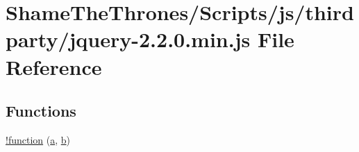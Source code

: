 \hypertarget{jquery-2_82_80_8min_8js}{}\section{Shame\+The\+Thrones/\+Scripts/js/thirdparty/jquery-\/2.2.0.min.\+js File Reference}
\label{jquery-2_82_80_8min_8js}
\subsection*{Functions}
\begin{DoxyCompactItemize}
\item 
\hyperlink{jquery-2_82_80_8min_8js_a43f0b96ea8ec44ca20ba86809a785614}{!function} (\hyperlink{_shame_the_thrones_2_scripts_2js_2thirdparty_2bootstrap_8min_8js_a1f5870dcf487187f13d5fd328ed9e6e7}{a}, \hyperlink{_shame_the_thrones_2_scripts_2js_2thirdparty_2bootstrap_8min_8js_a398bb8542498d1b14178b02b99df309b}{b})
\item 

\end{DoxyCompactItemize}

